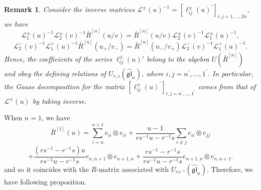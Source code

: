 \documentclass[10pt,a4paper]{amsart}
\newtheorem{remark}[theorem]{Remark}
\numberwithin{equation}{section}
\begin{document}
  		\begin{remark}\label{r:22}	
 Consider the inverse matrices $\mathcal{L}^{ \pm}(u)^{-1}=\left[\ell_{i j}^{ \pm}(u)^{\prime}\right]_{i, j=1, \ldots, 2 n}$, we have
 $$
 \mathcal{L}_1^{ \pm}(u)^{-1} \mathcal{L}_2^{ \pm}(v)^{-1} \bar{R}^{[n]}(u / v)=\bar{R}^{[n]}(u / v) \mathcal{L}_2^{ \pm}(v)^{-1} \mathcal{L}_1^{ \pm}(u)^{-1},
 $$
 $$
 \mathcal{L}_2^{-}(v)^{-1} \mathcal{L}_1^{+}(u)^{-1} \bar{R}^{[n]}\left(u_{+} / v_{-}\right)=\bar{R}^{[n]}\left(u_{-} / v_{+}\right) \mathcal{L}_2^{-}(v)^{-1} \mathcal{L}_1^{+}(u)^{-1} .
 $$
 Hence, the coefficients of the series $\ell^{\pm}_{ij}(u)'$ belong to the algebra $U\left(\bar{R}^{[n]}\right)$
 and obey the defining relations of $U_{r, s}(\widehat{\mathfrak{g l}}_n)$, where $i, j=n^{\prime}, \ldots, 1^{\prime}$.  In particular, the Gauss
 decomposition for the matrix $\left[\ell_{i j}^{ \pm}(u)^{\prime}\right]_{i, j=n^{\prime}, \ldots, 1^{\prime}}$ comes from that of
 $\mathcal{L}^{ \pm}(u)$ by taking inverse.
		  	\end{remark}
When $n=1$, we have
$$
\bar{R}^{[1]}(u)=\sum_{i=n}^{n+1} e_{i i} \otimes e_{i i}+\frac{u-1}{r s^{-1} u-r^{-1} s} \sum_{i \neq j} e_{i i} \otimes e_{j j}
$$
$$
	 +\frac{\left(r s^{-1}-r^{-1} s\right) u}{r s^{-1} u-r^{-1} s} e_{n, n+1} \otimes e_{n+1, n}+\frac{r s^{-1}-r^{-1} s}{r s^{-1} u-r^{-1} s} e_{n+1, n} \otimes e_{n, n+1}.
$$
and so it coincides with the $R$-matrix associated with $U_{r s^{-1}}(\widehat{\mathfrak{g l}}_n)$.  Therefore, we have following proposition.
\end{document}
